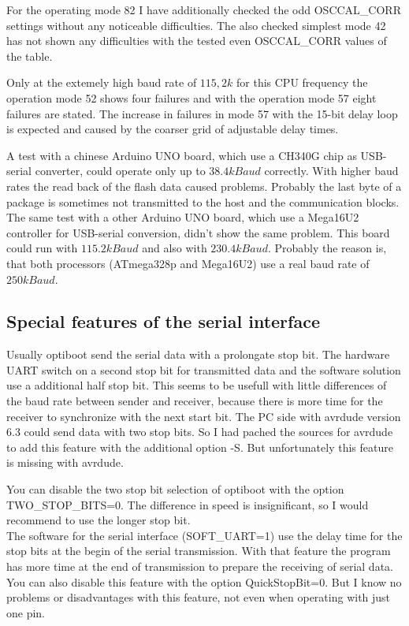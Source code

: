 For the operating mode 82 I have additionally checked the odd OSCCAL\_CORR settings without
any noticeable difficulties. The also checked simplest mode 42 has not shown
any difficulties with the tested even OSCCAL\_CORR values of the table.

Only at the extemely high baud rate of \(115,2k\) for this CPU frequency the operation
mode 52 shows four failures and with the operation mode 57 eight failures are stated.
The increase in failures in mode 57 with the 15-bit delay loop is expected and caused by
the coarser grid of adjustable delay times.

A test with a chinese Arduino UNO board, which use a CH340G chip as USB-serial converter,
could operate only up to \(38.4kBaud\) correctly.
With higher baud rates the read back of the flash data caused problems.
Probably the last byte of a package is sometimes not transmitted to the host and
the communication blocks.
The same test with a other Arduino UNO board, which use a Mega16U2 controller
for USB-serial conversion, didn't show the same problem.
This board could run with \(115.2kBaud\) and also with \(230.4kBaud\). 
Probably the reason is, that both processors (ATmega328p and Mega16U2)
use a real baud rate of \(250kBaud\).

\subsection{Special features of the serial interface}

Usually optiboot send the serial data with a prolongate stop bit.
The hardware UART switch on a second stop bit for transmitted data and the
software solution use a additional half stop bit.
This seems to be usefull with little differences of the baud rate between sender and receiver,
because there is more time for the receiver to synchronize with the next start bit.
The PC side with avrdude version 6.3 could send data with two stop bits.
So I had pached the sources for avrdude to add this feature with the additional option -S.
But unfortunately this feature is missing with avrdude.

You can disable the two stop bit selection of optiboot with the option TWO\_STOP\_BITS=0.
The difference in speed is insignificant, so I would recommend to use the longer stop bit.\\

The software for the serial interface (SOFT\_UART=1) use the delay time for the stop bits
at the begin of the serial transmission. With that feature the program has more time
at the end of transmission to prepare the receiving of serial data.
You can also disable this feature with the option QuickStopBit=0. But I know no problems
or disadvantages with this feature, not even when operating with just one pin.



